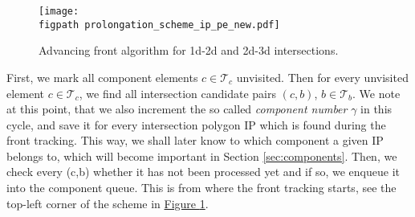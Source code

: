 \documentclass{elsarticle}
\newcommand{\fig}[1]{\hyperref[#1]{Figure \ref{#1}}}
\newcommand{\figpath}{figures/}
\begin{document}
%
\begin{figure}[!htb]
  \centering    
    \texttt{[image: \\figpath prolongation\_scheme\_ip\_pe\_new.pdf]}
  \caption{Advancing front algorithm for 1d-2d and 2d-3d intersections.}
  \label{fig:prolongation}
\end{figure}

First, we mark all component elements $c\in\mathcal T_c$ unvisited. Then for every unvisited element $c\in \mathcal T_c$, we find all intersection candidate pairs $(c,b)$, $b\in\mathcal T_b$.
We note at this point, that we also increment the so called \emph{component number} $\gamma$ in this cycle, and
save it for every intersection polygon IP which is found during the front tracking. This way, we shall
later know to which component a given IP belongs to, which will become important in Section \ref{sec:components}.
Then, we check every (c,b) whether it has not been processed yet and if so, we enqueue it into the component queue.
This is from where the front tracking starts, see the top-left corner of the scheme in \fig{fig:prolongation}.
\end{document}
